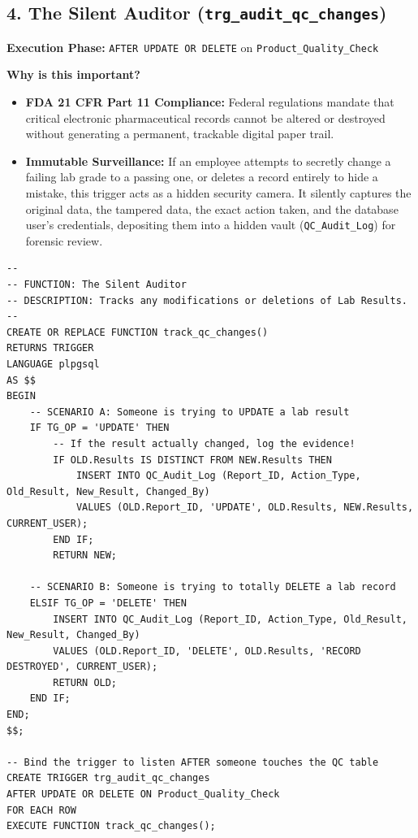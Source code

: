 \documentclass[12pt, a4paper]{article}
\begin{document}
\clearpage
\subsection{4. The Silent Auditor (\texttt{trg\_audit\_qc\_changes})}
\textbf{Execution Phase:} \texttt{AFTER UPDATE OR DELETE} on \texttt{Product\_Quality\_Check}

\textbf{Why is this important?}
\begin{itemize}
    \item[$\rightarrow$] \textbf{FDA 21 CFR Part 11 Compliance:} Federal regulations mandate that critical electronic pharmaceutical records cannot be altered or destroyed without generating a permanent, trackable digital paper trail. 
    \item[$\rightarrow$] \textbf{Immutable Surveillance:} If an employee attempts to secretly change a failing lab grade to a passing one, or deletes a record entirely to hide a mistake, this trigger acts as a hidden security camera. It silently captures the original data, the tampered data, the exact action taken, and the database user's credentials, depositing them into a hidden vault (\texttt{QC\_Audit\_Log}) for forensic review.
\end{itemize}

\begin{lstlisting}
-- 
-- FUNCTION: The Silent Auditor
-- DESCRIPTION: Tracks any modifications or deletions of Lab Results.
--
CREATE OR REPLACE FUNCTION track_qc_changes()
RETURNS TRIGGER 
LANGUAGE plpgsql
AS $$
BEGIN
    -- SCENARIO A: Someone is trying to UPDATE a lab result
    IF TG_OP = 'UPDATE' THEN
        -- If the result actually changed, log the evidence!
        IF OLD.Results IS DISTINCT FROM NEW.Results THEN
            INSERT INTO QC_Audit_Log (Report_ID, Action_Type, Old_Result, New_Result, Changed_By)
            VALUES (OLD.Report_ID, 'UPDATE', OLD.Results, NEW.Results, CURRENT_USER);
        END IF;
        RETURN NEW;

    -- SCENARIO B: Someone is trying to totally DELETE a lab record
    ELSIF TG_OP = 'DELETE' THEN
        INSERT INTO QC_Audit_Log (Report_ID, Action_Type, Old_Result, New_Result, Changed_By)
        VALUES (OLD.Report_ID, 'DELETE', OLD.Results, 'RECORD DESTROYED', CURRENT_USER);
        RETURN OLD;
    END IF;
END;
$$;

-- Bind the trigger to listen AFTER someone touches the QC table
CREATE TRIGGER trg_audit_qc_changes
AFTER UPDATE OR DELETE ON Product_Quality_Check
FOR EACH ROW
EXECUTE FUNCTION track_qc_changes();
\end{lstlisting}
\end{document}
